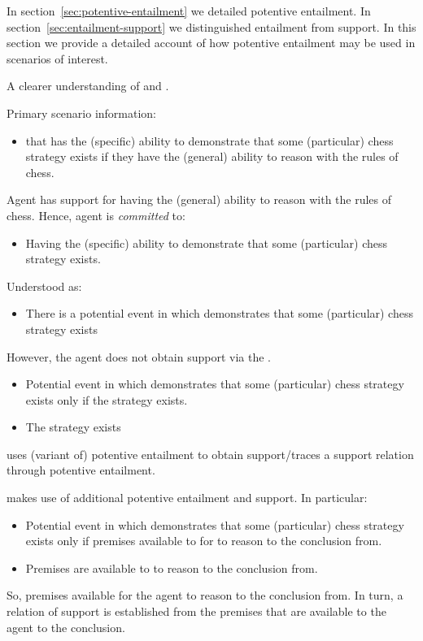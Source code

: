 \begin{note}[Overview]
  In section~\ref{sec:potentive-entailment} we detailed potentive entailment.
  In section~\ref{sec:entailment-support} we distinguished entailment from support.
  In this section we provide a detailed account of how potentive entailment may be used in scenarios of interest.

  A clearer understanding of \AR{} and \WR{}.

  Primary scenario information:
  \begin{itemize}
  \item \gsi{} that \agent{} has the (specific) ability to demonstrate that some (particular) chess strategy exists if they have the (general) ability to reason with the rules of chess.
  \end{itemize}
  Agent has support for having the (general) ability to reason with the rules of chess.
  Hence, agent is \emph{committed} to:
  \begin{itemize}
  \item Having the (specific) ability to demonstrate that some (particular) chess strategy exists.
  \end{itemize}
  Understood as:
  \begin{itemize}
  \item There is a potential event in which \agent{} demonstrates that some (particular) chess strategy exists
  \end{itemize}
  However, the agent does not obtain support via the \gsi{}.

  \begin{itemize}
  \item\label{ent:ex:chess} Potential event in which \agent{} demonstrates that some (particular) chess strategy exists only if the strategy exists.
  \item The strategy exists
  \end{itemize}

  \AR{} uses (variant of) potentive entailment to obtain support/traces a support relation through potentive entailment.

  \WR{} makes use of additional potentive entailment and support.
  In particular:

  \begin{itemize}
  \item Potential event in which \agent{} demonstrates that some (particular) chess strategy exists only if premises available to \agent{} for \agent{} to reason to the conclusion from.
  \item Premises are available to \agent{} to reason to the conclusion from.
  \end{itemize}

  So, premises available for the agent to reason to the conclusion from.
  In turn, a relation of support is established from the premises that are available to the agent to the conclusion.
\end{note}

